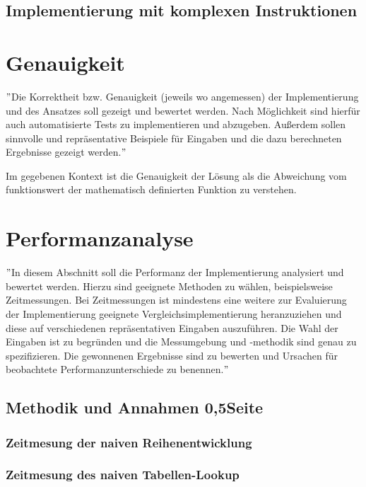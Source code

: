 \documentclass[course=erap]{aspdoc}
\begin{document}
    \subsection{Implementierung mit komplexen Instruktionen}


    \section{Genauigkeit}
    \("\)Die Korrektheit bzw. Genauigkeit (jeweils wo angemessen) der Implementierung und des Ansatzes
    soll gezeigt und bewertet werden.
    Nach Möglichkeit sind hierfür auch automatisierte Tests zu implementieren und abzugeben.
    Außerdem sollen sinnvolle und repräsentative Beispiele für Eingaben und die dazu berechneten Ergebnisse gezeigt werden.\("\)

    Im gegebenen Kontext ist die Genauigkeit der Lösung als die Abweichung vom funktionswert der mathematisch definierten Funktion zu verstehen.


    \section{Performanzanalyse}
    \("\)In diesem Abschnitt soll die Performanz der Implementierung analysiert und bewertet werden.
    Hierzu sind geeignete Methoden zu wählen, beispielsweise Zeitmessungen.
    Bei Zeitmessungen ist mindestens eine weitere zur Evaluierung der Implementierung geeignete Vergleichsimplementierung
    heranzuziehen und diese auf verschiedenen repräsentativen Eingaben auszuführen.
    Die Wahl der Eingaben ist zu begründen und die Messumgebung und -methodik sind genau zu spezifizieren.
    Die gewonnenen Ergebnisse sind zu bewerten und Ursachen für beobachtete Performanzunterschiede zu benennen.\("\)

    \subsection{Methodik und Annahmen 0,5Seite}

    \subsubsection{Zeitmesung der naiven Reihenentwicklung}

    \subsubsection{Zeitmesung des naiven Tabellen-Lookup}
\end{document}

